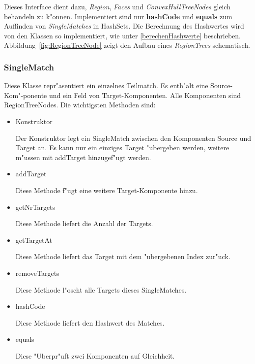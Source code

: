 Dieses Interface dient dazu, \textit{Region}, \textit{Faces} und \textit{ConvexHullTreeNodes} gleich behandeln zu k"onnen. Implementiert sind nur \textbf{hashCode} und \textbf{equals} zum Auffinden von \textit{SingleMatches} in HashSets. Die Berechnung des Hashwertes wird von den Klassen so implementiert, wie unter \vref{berechenHashwerte} beschrieben. Abbildung~\vref{fig:RegionTreeNode} zeigt den Aufbau eines \textit{RegionTrees} schematisch.




\subsubsection{SingleMatch}
Diese Klasse repr"asentiert ein einzelnes Teilmatch.  Es enth"alt eine Source-Kom"-ponente und ein Feld von Target-Komponenten. Alle Komponenten sind RegionTreeNodes.
Die wichtigsten Methoden sind:

\begin{itemize}
\item Konstruktor

Der Konstruktor legt ein SingleMatch zwischen den Komponenten Source und Target an. Es kann nur ein einziges Target "ubergeben werden, weitere m"ussen mit addTarget hinzugef"ugt werden.



\item addTarget

Diese Methode f"ugt eine weitere Target-Komponente hinzu.

\item getNrTargets

Diese Methode liefert die Anzahl der Targets.

\item getTargetAt

Diese Methode liefert das Target mit dem "ubergebenen Index zur"uck.

\item removeTargets

Diese Methode l"oscht alle Targets dieses SingleMatches.

\item hashCode

Diese Methode liefert den Hashwert des Matches.

\item equals

Diese "Uberpr"uft zwei Komponenten auf Gleichheit.

\end{itemize}

